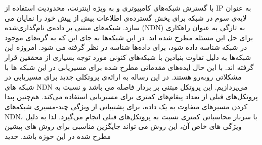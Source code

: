 

\pagestyle{empty}

\begin{center}
\end{center}

با گسترش شبکه‌های کامپیوتری و به ویژه اینترنت، محدودیت استفاده از IP به عنوان لایه‌ی سوم در شبکه برای پخش گسترده‌ی اطلاعات بیش از پیش خود را نمایان می سازد. شبکه‌های مبتنی بر داده‌ی نام‌گذاری‌شده (NDN) به تازگی به عنوان راهکاری برای حل این مسئله مطرح شده اند. در این شبکه‌ها به جای این که به گره‌های موجود در شبکه شناسه داده شود، برای داده‌ها شناسه در نظر گرفته می شود. امروزه این شبکه‌ها به دلیل تفاوت بنیادین با شبکه‌های کنونی مورد توجه بسیاری از محققین قرار گرفته اند. با این حال ایده‌های مقدماتی مطرح شده برای مسیریابی در این شبکه ها با مشکلاتی روبه‌رو هستند. در این رساله به ارائه‌ی پروتکلی جدید برای مسیریابی در شبکه های ‌NDN می‌پردازیم. این پروتکل مبتنی بر بردار فاصله می باشد و نسبت به پروتکل‌های قبلی از تعداد پیغام‌های کمتری برای مسیریابی استفاده می‌کند. هم‌چنین پیدا کردن مسیرهای متفاوت به یک داده، برای پشتیبانی از ویژگی چند-مسیری شبکه‌های NDN، با سربار محاسباتی کمتری نسبت به پروتکل‌های قبلی انجام می‌گیرد. لذا به دلیل ویژگی های خاص آن، این روش می تواند جایگزین مناسبی برای روش های پیشین مطرح شده در این حوزه باشد.
‌جدید
